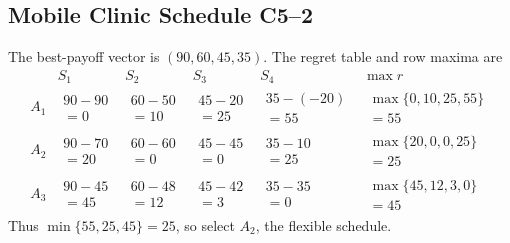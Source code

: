 \subsection{Mobile Clinic Schedule \hfill C5--2}
The best-payoff vector is $(90,60,45,35)$. The regret table and row maxima are
\[
\begin{array}{c|cccc|c}
 &S_1&S_2&S_3&S_4&\max r\\ \hline
A_1&\begin{gathered}90-90\\=0\end{gathered}&\begin{gathered}60-50\\=10\end{gathered}&\begin{gathered}45-20\\=25\end{gathered}&\begin{gathered}35-(-20)\\=55\end{gathered}&\begin{gathered}\max\{0,10,25,55\}\\=55\end{gathered}\\[6pt]
A_2&\begin{gathered}90-70\\=20\end{gathered}&\begin{gathered}60-60\\=0\end{gathered}&\begin{gathered}45-45\\=0\end{gathered}&\begin{gathered}35-10\\=25\end{gathered}&\begin{gathered}\max\{20,0,0,25\}\\=25\end{gathered}\\[6pt]
A_3&\begin{gathered}90-45\\=45\end{gathered}&\begin{gathered}60-48\\=12\end{gathered}&\begin{gathered}45-42\\=3\end{gathered}&\begin{gathered}35-35\\=0\end{gathered}&\begin{gathered}\max\{45,12,3,0\}\\=45\end{gathered}
\end{array}
\]
Thus $\min\{55,25,45\}=25$, so select $\boxed{A_2}$, the flexible schedule.

